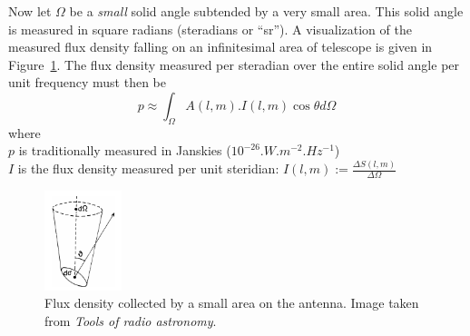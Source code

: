 Now let $\Omega$ be a \textit{small} solid angle subtended by a very small area. This solid angle is measured in square radians (steradians or ``sr''). A visualization 
of the measured flux density falling on an infinitesimal area of telescope is given in Figure~\ref{fig_measuring_source_brightness}. The flux density measured 
per steradian over the entire solid angle per unit frequency must then be 
  \begin{equation}
    p \approx \int_{\Omega}{A(l,m).I(l,m)\cos{\theta}d\Omega}
    \label{REF_EQN_SINGLE_ANTENNA}
  \end{equation}
where\\
  $p$ is traditionally measured in Janskies ($10^{-26}.W.m^{-2}.Hz^{-1}$)\\
  $I$ is the flux density measured per unit steridian: $I(l,m) := \frac{\Delta S(l,m)}{\Delta\Omega}$\\
\begin{figure}[ht]
\begin{mdframed}
 \centering
 \includegraphics[width=0.2\textwidth]{images/measuring_source_brightness.png}
 \caption[Source brightness]{Flux density collected by a small area on the antenna. Image taken from \textit{Tools of radio astronomy}\cite{wilson2009tools}.}
 \label{fig_measuring_source_brightness}
\end{mdframed}
\end{figure}

